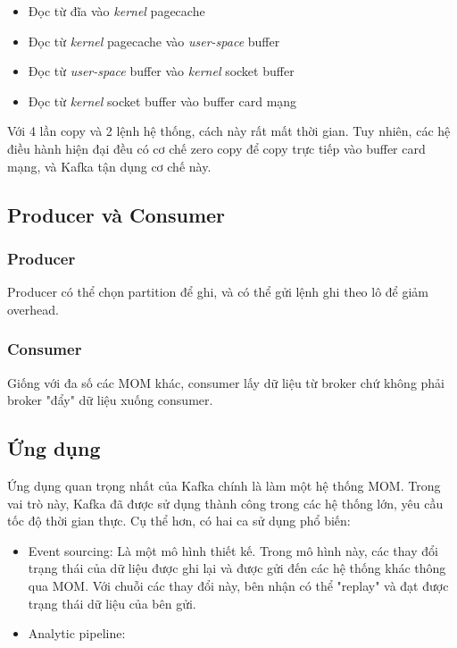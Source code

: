 \documentclass{article}
\begin{document}
\begin{itemize}
    \item Đọc từ đĩa vào \emph{kernel} pagecache
    \item Đọc từ \emph{kernel} pagecache vào \emph{user-space} buffer
    \item Đọc từ \emph{user-space} buffer vào \emph{kernel} socket buffer
    \item Đọc từ \emph{kernel} socket buffer vào buffer card mạng
\end{itemize}

Với 4 lần copy và 2 lệnh hệ thống, cách này rất mất thời gian. Tuy nhiên, các hệ
điều hành hiện đại đều có cơ chế zero copy để copy trực tiếp vào buffer card
mạng, và Kafka tận dụng cơ chế này.

\subsection{Producer và Consumer}

\subsubsection{Producer}

Producer có thể chọn partition để ghi, và có thể gửi lệnh ghi theo lô để giảm
overhead.

\subsubsection{Consumer}

Giống với đa số các MOM khác, consumer lấy dữ liệu từ broker chứ không phải
broker "đẩy" dữ liệu xuống consumer.

\subsection{Ứng dụng}

Ứng dụng quan trọng nhất của Kafka chính là làm một hệ thống MOM.  Trong vai trò
này, Kafka đã được sử dụng thành công trong các hệ thống lớn, yêu cầu tốc độ
thời gian thực. Cụ thể hơn, có hai ca sử dụng phổ biến:

\begin{itemize}
    \item Event sourcing: Là một mô hình thiết kế. Trong mô hình này, các thay
    đổi trạng thái của dữ liệu được ghi lại và được gửi đến các hệ thống khác
    thông qua MOM. Với chuỗi các thay đổi này, bên nhận có thể "replay" và đạt
    được trạng thái dữ liệu của bên gửi.
    \item Analytic pipeline:
\end{itemize}
\end{document}
